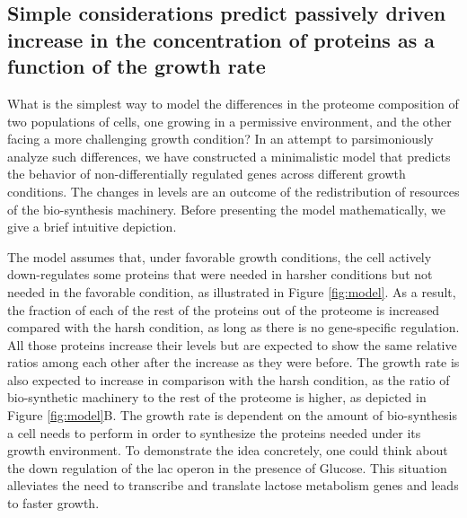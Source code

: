 \subsection{Simple considerations predict passively driven increase in the concentration of proteins as a function of the growth rate}
What is the simplest way to model the differences in the proteome composition of two populations of cells, one growing in a permissive environment, and the other facing a more challenging growth condition?
In an attempt to parsimoniously analyze such differences, we have constructed a minimalistic model that predicts the behavior of non-differentially regulated genes across different growth conditions. The changes in levels are an outcome of the redistribution of resources of the bio-synthesis machinery.
Before presenting the model mathematically, we give a brief intuitive depiction.

The model assumes that, under favorable growth conditions, the cell actively down-regulates some proteins that were needed in harsher conditions but not needed in the favorable condition, as illustrated in Figure \ref{fig:model}.
As a result, the fraction of each of the rest of the proteins out of the proteome is increased compared with the harsh condition, as long as there is no gene-specific regulation. All those proteins increase their levels but are expected to show the same relative ratios among each other after the increase as they were before. 
The growth rate is also expected to increase in comparison with the harsh condition, as the ratio of bio-synthetic machinery to the rest of the proteome is higher, as  depicted in Figure \ref{fig:model}B.
The growth rate is dependent on the amount of bio-synthesis a cell needs to perform in order to synthesize the proteins needed under its growth environment. 
To demonstrate the idea concretely, one could think about the down regulation of the lac operon in the presence of Glucose. This situation alleviates the need to transcribe and translate lactose metabolism genes and leads to faster growth.